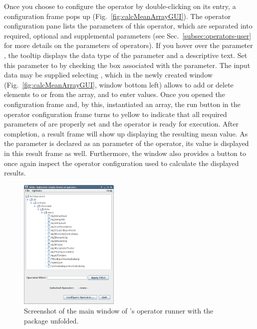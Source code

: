 Once you choose to configure the operator by double-clicking on its entry, a
configuration frame pops up (Fig.~\ref{fig:calcMeanArrayGUI}).
The operator configuration pane lists the parameters of this operator,
which are separated into required, optional and supplemental parameters
(see Sec.~\ref{subsec:operators-user} for more details on the parameters of
operators).
If you hover over the parameter , the tooltip
displays the data type of the parameter and a descriptive text.
Set this parameter to  by checking the box associated with the
parameter. The input data may be supplied selecting , which in the newly created window
(Fig.~\ref{fig:calcMeanArrayGUI}, window bottom left) allows to add or delete
elements to or from the array, and to enter values.
Once you opened the configuration frame and, by this, instantiated an array, the
run button in the operator configuration frame turns to yellow to indicate that
all required parameters of  are properly set and the
operator is ready for execution.
After completion, a result frame will show up displaying the resulting mean
value. As the parameter  is declared as an
 parameter of the operator, its value is displayed in this result
frame as well. Furthermore, the window also provides a button to once
again inspect the operator configuration used to calculate the displayed
results.
\begin{figure}[t]
\begin{center}
\includegraphics[width=0.425\textwidth]{../images/screenShotOpRunnerMain.png}
\caption{\label{fig:OpRunnerGUIMain}
	Screenshot of the main window of \alida's operator runner with the
	 package unfolded.}
\end{center}
\end{figure}

